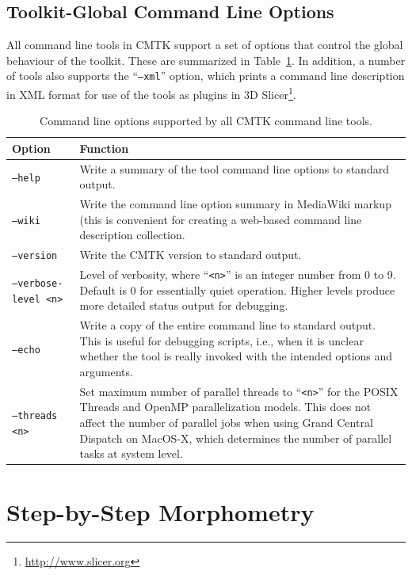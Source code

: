 \documentclass{InsightArticle}
\begin{document}
\subsection{Toolkit-Global Command Line Options}

All command line tools in CMTK support a set of options that control the
global behaviour of the toolkit. These are summarized in
Table~\ref{tab:GlobalOptions}. In addition, a number of tools also supports
the ``{\tt --xml}'' option, which prints a command line description in XML
format for use of the tools as plugins in  3D
Slicer\footnote{\url{http://www.slicer.org}}.

\begin{table}[tbp]
\begin{center}
\begin{tabular}{lp{10cm}}
\hline
Option & Function \\
\hline
\tt --help & Write a summary of the tool command line options to standard
  output. \\
\tt --wiki & Write the command line option summary in MediaWiki markup (this
is convenient for creating a web-based command line description collection. \\
\tt --version & Write the CMTK version to standard output. \\
\tt --verbose-level <n>& Level of verbosity, where ``{\tt <n>}'' is an integer
number from 0 to 9. Default is 0 for essentially quiet operation. Higher
levels produce more detailed status output for debugging. \\
\tt --echo & Write a copy of the entire command line to standard output. This
is useful for debugging scripts, i.e., when it is unclear whether the tool is
really invoked with the intended options and arguments. \\
\tt --threads <n> & Set maximum number of parallel threads to ``{\tt <n>}'' for the
POSIX Threads and OpenMP parallelization models. This does not affect the
number of parallel jobs when using Grand Central Dispatch on MacOS-X, which
determines the number of parallel tasks at system level. \\
\hline
\end{tabular}
\end{center}
\caption{Command line options supported by all CMTK command line tools.}
\label{tab:GlobalOptions}
\end{table}

\clearpage
\section{Step-by-Step Morphometry}
\end{document}
